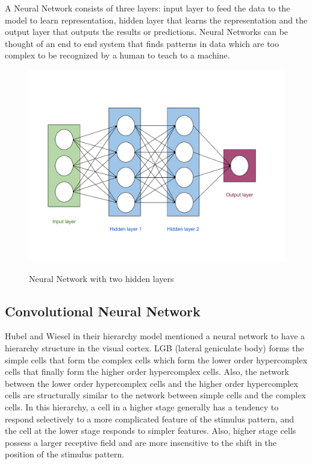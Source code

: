 A Neural Network consists of three layers: input layer to feed the data to the model to learn representation, hidden layer that learns the representation and the output layer that outputs the results or predictions. Neural Networks can be thought of an end to end system that finds patterns in data which are too complex to be recognized by a human to teach to a machine. 


\begin{figure}[H]
\begin{center}
\includegraphics[height=.58\textheight]{Chapter2/Figs/MLP.pdf}
\label{fig:Two Layered Neural_Network}
\caption{Neural Network with two hidden layers}
\end{center}
\end{figure}


\subsection{Convolutional Neural Network}

Hubel and Wiesel in their hierarchy model mentioned a neural network to have a hierarchy structure in the visual cortex. LGB (lateral geniculate body) forms the simple cells that form the complex cells which form the lower order hypercomplex cells that finally form the higher order hypercomplex cells.
Also, the network between the lower order hypercomplex cells and the higher order hypercomplex cells are structurally similar to the network between simple cells and the complex cells. In this hierarchy, a cell in a higher stage generally has a tendency to respond selectively to a more complicated feature of the stimulus pattern, and the cell at the lower stage responds to simpler features. Also, higher stage cells possess a larger receptive field and are more insensitive to the shift in the position of the stimulus pattern.

